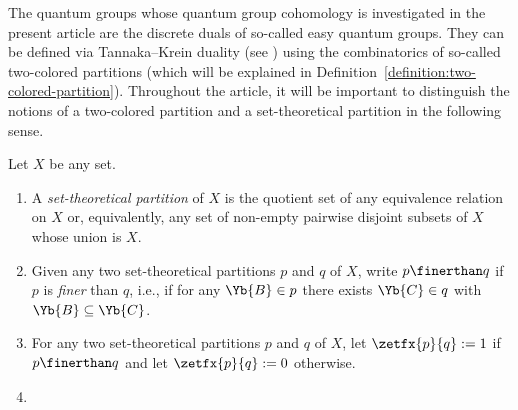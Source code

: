 \documentclass[pdftex]{sigma}
\numberwithin{equation}{section}
\begin{document}
The quantum groups whose quantum group cohomology is investigated in the present article are the discrete duals of so-called easy quantum groups. They can be defined via Tannaka--Krein duality (see \cite{Woronowicz1988}) using the combinatorics of so-called two-colored partitions (which will be explained in Definition~\ref{definition:two-colored-partition}). Throughout the article, it will be important to distinguish the notions of a two-co\-lo\-red partition and a set-theo\-re\-ti\-cal partition in the following sense.
\begin{Notation}
  \label{notation:set-theoretical-partitions}
  \newcommand{\theset}{X}
  Let $\theset$ be any set.
  \begin{enumerate}
  \item\label{notation:set-theoretical-partitions-1}
    {
      \newcommand{\thepartition}{p}
      A \emph{set-theo\-re\-ti\-cal partition} of $X$ is the quotient set of any equivalence relation on $X$ or, equivalently,  any set of non-empty pairwise disjoint subsets of $X$ whose union is $X$.
      }
  \item\label{notation:set-theoretical-partitions-2}
    {
      \newcommand{\smallpart}{p}
      \newcommand{\largepart}{q}
      \newcommand{\smallblock}{\Yb{B}}
      \newcommand{\largeblock}{\Yb{C}}
      \newcommand{\leftpartition}{p_1}
      \newcommand{\rightpartition}{p_2}
      \newcommand{\thejoin}{s}
      \newcommand{\thepartition}{p}
      \newcommand{\anyel}{\Yp{x}}
      \newcommand{\block}{\Yb{B}}
      Given any two set-theo\-re\-ti\-cal partitions $\smallpart$ and $\largepart$ of  $\theset$, write $\smallpart\finerthan\largepart$ if $\smallpart$ is \emph{finer} than $\largepart$, i.e., if for any $\smallblock\in\smallpart$ there exists $\largeblock\in\largepart$  with $\smallblock\subseteq \largeblock$.
      }
  \item\label{notation:set-theoretical-partitions-3}
    {
      \newcommand{\smallpart}{p}
      \newcommand{\largepart}{q}
      \newcommand{\smallblock}{\Yb{B}}
      \newcommand{\largeblock}{\Yb{C}}
      \newcommand{\leftpartition}{p_1}
      \newcommand{\rightpartition}{p_2}
      \newcommand{\thejoin}{s}
      \newcommand{\thepartition}{p}
      \newcommand{\anyel}{\Yp{x}}
      \newcommand{\block}{\Yb{B}}
      For any two set-theo\-re\-ti\-cal partitions $\smallpart$ and $\largepart$ of $\theset$, let $\zetfx{\smallpart}{\largepart}:= 1$ if $\smallpart\finerthan\largepart$ and  let $\zetfx{\smallpart}{\largepart}:= 0$ otherwise.
    }
  \item\label{notation:set-theoretical-partitions-4}

\end{enumerate}
\end{Notation}
\end{document}
